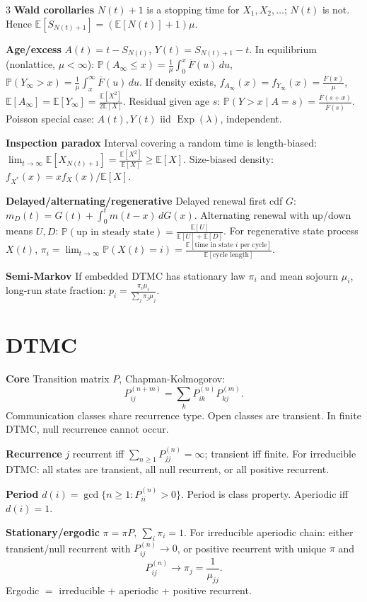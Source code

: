 \documentclass[a4paper,8pt,fleqn]{extarticle}
\newcommand{\E}{\mathbb{E}}
\newcommand{\PP}{\mathbb{P}}
\newcommand{\1}{\mathbf{1}}
\newcommand{\barF}{\overline{F}}
\newcommand{\sub}[1]{\textbf{#1} }
\DeclareMathOperator{\Exp}{Exp}
\begin{document}
\begin{multicols}{3}
\sub{Wald corollaries} \(N(t)+1\) is a stopping time for \(X_1,X_2,\dots\); \(N(t)\) is not. Hence \(\E[S_{N(t)+1}]=(\E[N(t)]+1)\mu\).

\sub{Age/excess} \(A(t)=t-S_{N(t)}\), \(Y(t)=S_{N(t)+1}-t\). In equilibrium (nonlattice, \(\mu<\infty\)): \(\PP(A_\infty\le x)=\frac{1}{\mu}\int_0^x \barF(u)\,du\), \(\PP(Y_\infty>x)=\frac{1}{\mu}\int_x^\infty \barF(u)\,du\). If density exists, \(f_{A_\infty}(x)=f_{Y_\infty}(x)=\frac{\barF(x)}{\mu}\), \(\E[A_\infty]=\E[Y_\infty]=\frac{\E[X^2]}{2\E[X]}\). Residual given age \(s\): \(\PP(Y>x\mid A=s)=\frac{\barF(s+x)}{\barF(s)}\). Poisson special case: \(A(t),Y(t)\) iid \(\Exp(\lambda)\), independent.

\sub{Inspection paradox} Interval covering a random time is length-biased: \(\lim_{t\to\infty}\E[X_{N(t)+1}]=\frac{\E[X^2]}{\E[X]}\ge \E[X]\). Size-biased density: \(f_{X^*}(x)=x f_X(x)/\E[X]\).

\sub{Delayed/alternating/regenerative} Delayed renewal first cdf \(G\): \(m_D(t)=G(t)+\int_0^t m(t-x)\,dG(x)\). Alternating renewal with up/down means \(U,D\): \(\PP(\text{up in steady state})=\frac{\E[U]}{\E[U]+\E[D]}\). For regenerative state process \(X(t)\), \(\pi_i=\lim_{t\to\infty}\PP(X(t)=i)=\frac{\E[\text{time in state }i\text{ per cycle}]}{\E[\text{cycle length}]}\).

\sub{Semi-Markov} If embedded DTMC has stationary law \(\pi_i\) and mean sojourn \(\mu_i\), long-run state fraction: \(p_i=\frac{\pi_i\mu_i}{\sum_j \pi_j\mu_j}\).

\section*{DTMC}
\sub{Core} Transition matrix \(P\), Chapman-Kolmogorov:
\[
P_{ij}^{(n+m)}=\sum_k P_{ik}^{(n)}P_{kj}^{(m)}.
\]
Communication classes share recurrence type. Open classes are transient. In finite DTMC, null recurrence cannot occur.

\sub{Recurrence} \(j\) recurrent iff \(\sum_{n\ge1}P_{jj}^{(n)}=\infty\); transient iff finite. For irreducible DTMC: all states are transient, all null recurrent, or all positive recurrent.

\sub{Period} \(d(i)=\gcd\{n\ge1:P_{ii}^{(n)}>0\}\). Period is class property. Aperiodic iff \(d(i)=1\).

\sub{Stationary/ergodic} \(\pi=\pi P,\ \sum_i\pi_i=1\). For irreducible aperiodic chain: either transient/null recurrent with \(P_{ij}^{(n)}\to0\), or positive recurrent with unique \(\pi\) and
\[
P_{ij}^{(n)}\to \pi_j=\frac{1}{\mu_{jj}}.
\]
Ergodic \(=\) irreducible + aperiodic + positive recurrent.


\end{multicols}
\end{document}
